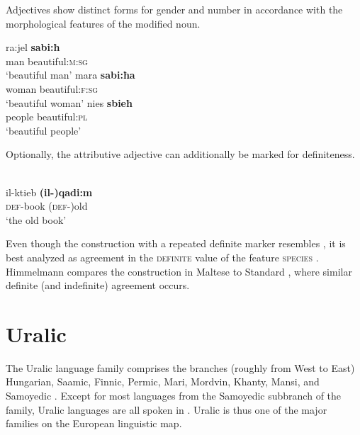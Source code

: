 Adjectives show distinct forms for gender and number in accordance with the morphological features of the modified noun.
\begin{exe}
\begin{xlist}
\ex
\gll	ra:jel \textbf{sabi:ħ}\\
	man beautiful:\textsc{m:sg}\\
\glt	‘beautiful man’
\ex
\gll	mara \textbf{sabi:ħa}\\
	woman beautiful:\textsc{f:sg}\\
\glt	‘beautiful woman’
\ex
\gll	nies \textbf{sbieħ}\\
	people beautiful:\textsc{pl}\\
\glt	‘beautiful people’
\end{xlist}
\end{exe}
Optionally, the attributive adjective can additionally be marked for definiteness.
\begin{exe}
\\
\gll	il-ktieb \textbf{(il-)qadi:m}\\
	\textsc{def}-book	(\textsc{def-})old\\
\glt	‘the old book’
\end{exe}
Even though the construction with a repeated definite marker resembles , it is best analyzed as agreement in the \textsc{definite} value of the feature \textsc{species} \citep[179]{himmelmann1997}. Himmelmann compares the construction in Maltese to Standard , where similar definite (and indefinite) agreement occurs.
				
\section{Uralic}
\label{uralic synchr}
The Uralic language family comprises the branches (roughly from West to East) Hungarian, Saamic, Finnic, Permic, Mari, Mordvin, Khanty, Mansi, and Samoyedic \citep[216–218]{salminen2007}. Except for most languages from the Samoyedic subbranch of the family, Uralic languages are all spoken in . Uralic is thus one of the major families on the European linguistic map.

